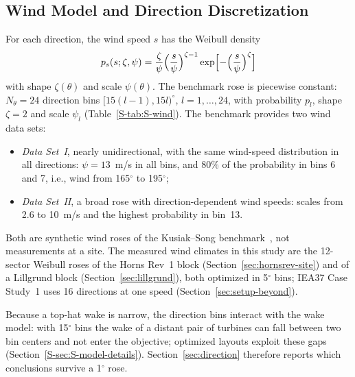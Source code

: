 \subsection{Wind Model and Direction Discretization}
\label{sec:wind}
For each direction, the wind speed $s$ has the Weibull density
\begin{equation*}
p_s(s;\zeta,\psi)=\frac{\zeta}{\psi}\Bigl(\frac{s}{\psi}\Bigr)^{\zeta-1}\exp\Bigl[-\Bigl(\frac{s}{\psi}\Bigr)^{\zeta}\Bigr]
\end{equation*}
with shape $\zeta(\theta)$ and scale $\psi(\theta)$. The benchmark rose is piecewise constant: $N_\theta=24$ direction bins $[15(l-1),15l)^\circ$, $l=1,\ldots,24$, with probability $p_l$, shape $\zeta=2$ and scale $\psi_l$ (Table~\ref{S-tab:S-wind}). The benchmark provides two wind data sets:
\begin{itemize}
\item \emph{Data Set~I}, nearly unidirectional, with the same wind-speed distribution in all directions: $\psi=13$~m/s in all bins, and 80\% of the probability in bins 6 and 7, i.e., wind from 165$^\circ$ to 195$^\circ$;
\item \emph{Data Set~II}, a broad rose with direction-dependent wind speeds: scales from 2.6 to 10~m/s and the highest probability in bin~13.
\end{itemize}
Both are synthetic wind roses of the Kusiak--Song benchmark~\cite{Kusiak2010,Bansal2017}, not measurements at a site. The measured wind climates in this study are the 12-sector Weibull roses of the Horns Rev~1 block (Section~\ref{sec:hornsrev-site}) and of a Lillgrund block (Section~\ref{sec:lillgrund}), both optimized in 5$^\circ$ bins; IEA37 Case Study~1 uses 16 directions at one speed (Section~\ref{sec:setup-beyond}).

Because a top-hat wake is narrow, the direction bins interact with the wake model: with 15$^\circ$ bins the wake of a distant pair of turbines can fall between two bin centers and not enter the objective; optimized layouts exploit these gaps (Section~\ref{S-sec:S-model-details}). Section~\ref{sec:direction} therefore reports which conclusions survive a 1$^\circ$ rose.

